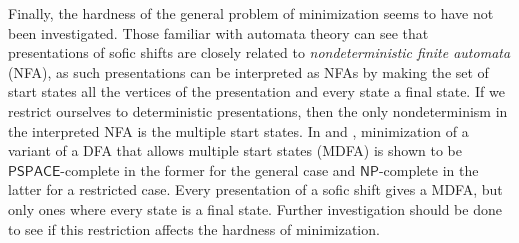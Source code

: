 \documentclass[hidelinks]{report}
\newcommand{\term}[1]{\textit{#1}}
\theoremstyle{definition}
\begin{document}
Finally, the hardness of the general problem of minimization seems 
to have not been investigated. Those familiar with 
automata theory can see that presentations of sofic shifts 
are closely related to \term{nondeterministic finite automata} (NFA),
as such presentations can be interpreted as NFAs
by making the set of start states 
all the vertices of the presentation and 
every state a final state. If we restrict 
ourselves to deterministic presentations, then the only 
nondeterminism in the interpreted NFA is the multiple start states. 
In \cite{holzer2001state} and \cite{malcher2004minimizing}, 
minimization of a variant of a DFA 
that allows multiple start states (MDFA) is shown to be 
\(\mathsf{PSPACE}\)-complete in the former for the general case and
 \(\mathsf{NP}\)-complete in the latter for a restricted case.
Every presentation of a sofic shift gives a MDFA, but only ones
where every state is a final state. Further investigation should 
be done to see if this restriction affects the hardness of minimization.

\printbibliography
\end{document}
